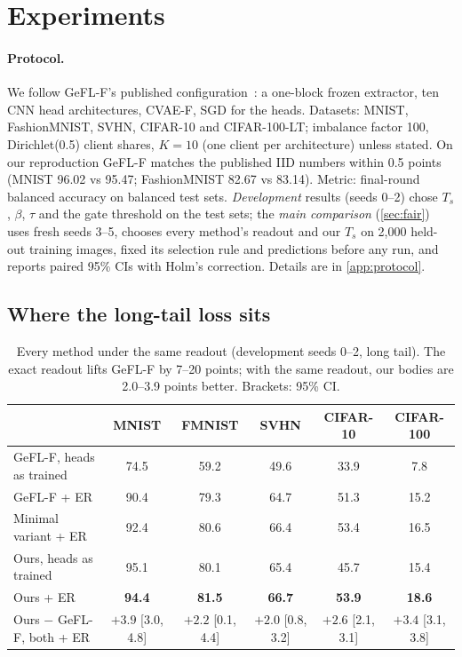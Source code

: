 \documentclass[10pt]{article}
\theoremstyle{plain}
\theoremstyle{definition}
\newcommand{\ER}{\textsc{ER}}
\newcommand{\pos}[1]{\textbf{#1}}
\begin{document}
\section{Experiments}\label{sec:experiments}

\paragraph{Protocol.} We follow GeFL-F's published configuration~\cite{kang2025gefl}: a one-block frozen extractor, ten
CNN head architectures, CVAE-F, SGD for the heads. Datasets: MNIST, FashionMNIST, SVHN, CIFAR-10 and CIFAR-100-LT;
imbalance factor 100, Dirichlet(0.5) client shares, $K=10$ (one client per architecture) unless stated. On our
reproduction GeFL-F matches the published IID numbers within 0.5 points (MNIST 96.02 vs 95.47; FashionMNIST 82.67 vs
83.14). Metric: final-round balanced accuracy on balanced test sets. \emph{Development} results (seeds 0--2) chose
$T_s$, $\beta$, $\tau$ and the gate threshold on the test sets; the \emph{main comparison} (\cref{sec:fair}) uses fresh
seeds 3--5, chooses every method's readout and our $T_s$ on 2,000 held-out training images, fixed its selection rule
and predictions before any run, and reports paired 95\% CIs with Holm's correction. Details are in \cref{app:protocol}.

\subsection{Where the long-tail loss sits}

\begin{table}[t]
\centering\small\setlength{\tabcolsep}{4.5pt}
\caption{Every method under the same readout (development seeds 0--2, long tail). The exact readout lifts GeFL-F by
7--20 points; with the same readout, our bodies are 2.0--3.9 points better. Brackets: 95\% CI.}
\label{tab:readout}
\begin{tabular}{lccccc}
\toprule
& MNIST & FMNIST & SVHN & CIFAR-10 & CIFAR-100\\
\midrule
GeFL-F, heads as trained & 74.5 & 59.2 & 49.6 & 33.9 & 7.8\\
GeFL-F + \ER & 90.4 & 79.3 & 64.7 & 51.3 & 15.2\\
Minimal variant + \ER & 92.4 & 80.6 & 66.4 & 53.4 & 16.5\\
Ours, heads as trained & 95.1 & 80.1 & 65.4 & 45.7 & 15.4\\
Ours + \ER & \pos{94.4} & \pos{81.5} & \pos{66.7} & \pos{53.9} & \pos{18.6}\\
\midrule
Ours $-$ GeFL-F, both + \ER & $+3.9$ {\scriptsize[3.0, 4.8]} & $+2.2$ {\scriptsize[0.1, 4.4]} & $+2.0$ {\scriptsize[0.8, 3.2]} & $+2.6$ {\scriptsize[2.1, 3.1]} & $+3.4$ {\scriptsize[3.1, 3.8]}\\
\bottomrule
\end{tabular}
\end{table}
\end{document}
